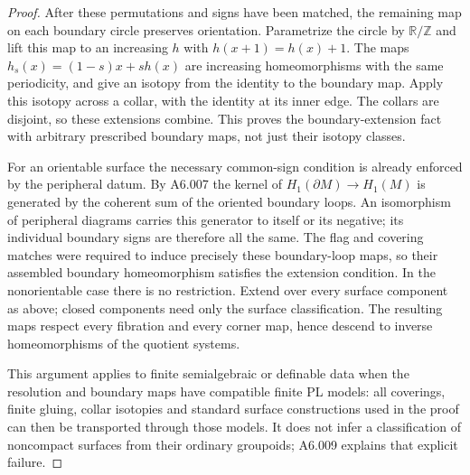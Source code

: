 \begin{proof}
After these permutations and signs have been matched, the remaining
map on each boundary circle preserves orientation. Parametrize the
circle by $\mathbb R/\mathbb Z$ and lift this map to an increasing
$h$ with $h(x+1)=h(x)+1$. The maps
$h_s(x)=(1-s)x+sh(x)$ are increasing homeomorphisms with the same
periodicity, and give an isotopy from the identity to the boundary
map. Apply this isotopy across a collar, with the identity at its
inner edge. The collars are disjoint, so these extensions combine.
This proves the boundary-extension fact with arbitrary prescribed
boundary maps, not just their isotopy classes.

For an orientable surface the necessary common-sign condition is
already enforced by the peripheral datum. By A6.007 the kernel
of $H_1(\partial M)\to H_1(M)$ is generated by the coherent sum
of the oriented boundary loops. An isomorphism of peripheral
diagrams carries this generator to itself or its negative; its
individual boundary signs are therefore all the same. The flag
and covering matches were required to induce precisely these
boundary-loop maps, so their assembled boundary homeomorphism
satisfies the extension condition. In the nonorientable case
there is no restriction. Extend over every surface component as
above; closed components need only the surface classification.
The resulting maps respect every fibration and every corner map,
hence descend to inverse homeomorphisms of the quotient systems.

This argument applies to finite semialgebraic or definable data
when the resolution and boundary maps have compatible finite PL
models: all coverings, finite gluing, collar isotopies and standard
surface constructions used in the proof can then be transported
through those models. It does not infer a classification of
noncompact surfaces from their ordinary groupoids; A6.009 explains
that explicit failure.
\end{proof}
